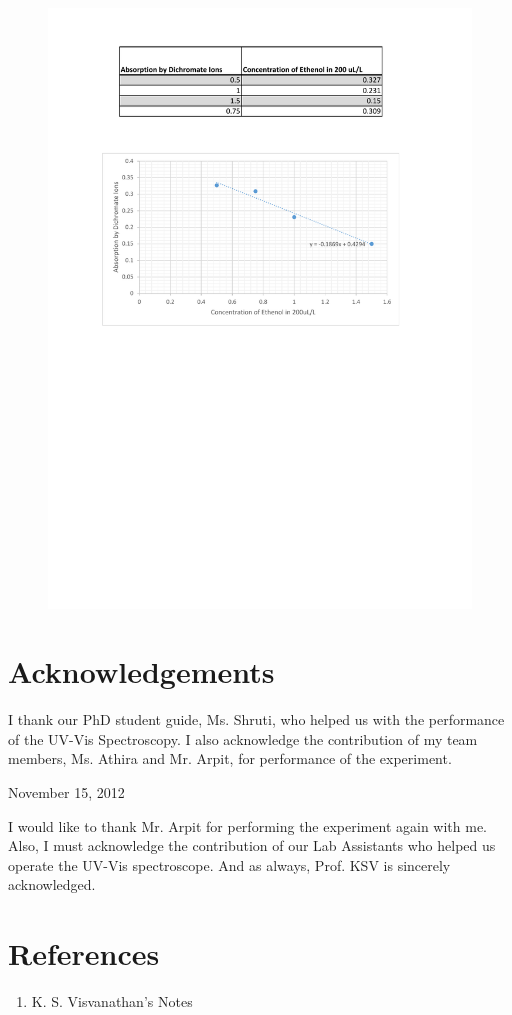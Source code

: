 \begin{figure}[bth]
	\begin{center}
		\includegraphics[width=1.15\linewidth]{gfx/makeup_lab}
	\end{center}
\caption[Dichromate's Absorption as a function of Alcohol Concentration]{\label{E4A}}
\end{figure}

\section{Acknowledgements}
I thank our PhD student guide, Ms. Shruti, who helped us with the performance of the UV-Vis Spectroscopy. I also acknowledge the contribution of my team members, Ms. Athira and Mr. Arpit, for performance of the experiment.

\begin{flushright}
November 15, 2012
\end{flushright}

I would like to thank Mr. Arpit for performing the experiment again with me. Also, I must acknowledge the contribution of our Lab Assistants who helped us operate the UV-Vis spectroscope. And as always, Prof. KSV is sincerely acknowledged.

\section{References}
\begin{enumerate}
	\item K. S. Visvanathan's Notes
\end{enumerate}